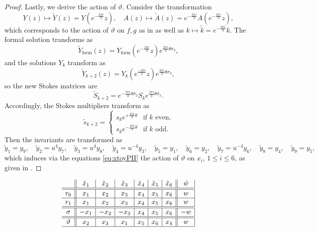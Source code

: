 \documentclass[a4paper,reqno]{amsart}
\numberwithin{equation}{section}
\newcommand{\pain}[1]{\operatorname{P}_{\mathrm{#1}}}
\numberwithin{equation}{section}
\begin{document}
\begin{proof}
Lastly, we derive the action of $\vartheta$. 
Consider the transformation
$$Y(z) \mapsto \widetilde{Y}(z)= Y(e^{-\frac{2\pi i}{3}}z),\quad A(z)\mapsto \widetilde{A}(z) = e^{-\frac{2\pi i}{3}}A(e^{-\frac{2\pi i }{3}}z),$$
which corresponds to the action of $\vartheta$ on $f,g$ as in  as well as $k \mapsto \tilde{k}= e^{-\frac{2 \pi i}{3}} k.$
The formal solution transforms as 
    $$ \widetilde{Y}_{\operatorname{form}}(z) =  Y_{\operatorname{form}}(e^{-\frac{2\pi i}{3}}z) e^{\frac{2\pi i}{3} \theta \sigma_3},$$
    and the solutions $Y_k$ transform as
 $$\widetilde{Y}_{k+2}(z) = Y_{k}(e^{\frac{-2\pi i}{3} }z) e^{\frac{2\pi i}{3} \theta \sigma_3},$$
so the new Stokes matrices are 
$$\widetilde{S}_{k+2} = e^{-\frac{2\pi i}{3} \theta \sigma_3} S_k e^{\frac{2\pi i}{3} \theta \sigma_3}.$$
Accordingly, the Stokes multipliers transform as 
$$\tilde{s}_{k+2} = \begin{cases}
    s_k e^{+\frac{4\pi i}{3}\theta} &\text{if $k$ even,}\\
    s_k e^{-\frac{4\pi i}{3}\theta} &\text{if $k$ odd.}
\end{cases}$$
Then the invariants are transformed as
$$\tilde{y}_{1} = y_9, \quad 
\tilde{y}_2 = u^4 y_7, \quad
\tilde{y}_3 = u^4 y_8, \quad 
\tilde{y}_4 = { u^{-4} y_3}, \quad 
\tilde{y}_5 = y_1, \quad 
\tilde{y}_6 = y_2, \quad 
\tilde{y}_7 = { u^{-4} y_6}, \quad 
\tilde{y}_8 = y_4, \quad 
\tilde{y}_9 = y_5,
$$
which induces via the equations \eqref{eq:xtoyPII} the action of $\vartheta$ on $x_i$, $1\leq i\leq 6$, as given in .
\end{proof}

\begingroup
\setlength{\tabcolsep}{15pt} %
\renewcommand{\arraystretch}{1.5} %
\begin{table}[h]
    \begin{equation*}
    \begin{array}{c||c|c|c|c|c|c||c|}
              & \tilde{x}_1    & \tilde{x}_2     & \tilde{x}_3    & \tilde{x}_4     & \tilde{x}_5   & \tilde{x}_6& \tilde{w}           \\
        \hline\hline 
        r_0   &   x_1    &  x_2    &  x_3 &    x_4 & x_5   &  x_6 & w             \\
        \hline
        r_1  &   x_1    &  x_2    &  x_3 &    x_4 & x_5   &  x_6 & w        \\
        \hline\hline
        \sigma   &   -x_1    &   -x_2    & -x_3   & x_4    &  x_5 &  x_6 & -w         
        \\
        \hline\hline
        \vartheta   &  x_2  &   x_3    & x_1 & x_5 & x_6  & x_4   &      w\\
        \hline
    \end{array}
    \end{equation*}
    \caption{Action of symmetries of $\pain{II}$ on $\mathcal{M}\rightarrow\mathscr{W}_{\rm{II}}$ under the Riemann-Hilbert map}
    \label{tab:PII:symmetriesunderRH}
\end{table}
\endgroup
\end{document}
